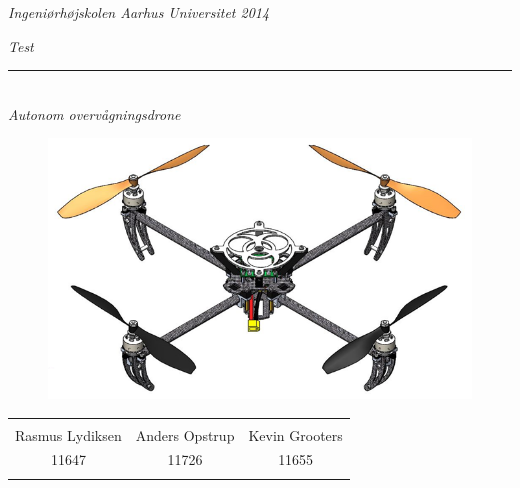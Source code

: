\thispagestyle{empty}

\begin{center}
\textsl{Ingeniørhøjskolen Aarhus Universitet 2014 } \\ \vspace{0.5cm}

\phantom{hul}

\textsl{\HUGE Test } \\ \vspace{0cm}
\rule{15cm}{0.5mm}  \\ \vspace{0.5cm}
\textsl{\LARGE Autonom overvågningsdrone } \\ \vspace{0.5cm}

\vspace{3.5cm}

\begin{figure}[H]
\centering
\includegraphics[width=1\textwidth]{Billeder/Forsidebillede.png}
\label{fig:Forside_foranalyse}
\end{figure}


\vspace{3.5cm}

\begin{table}[H]
	\centering
		\begin{tabular}{c c c}
			\underline{\phantom{mmmmmmmmmmmmmm}} & \underline{\phantom{mmmmmmmmmmmmmm}} & \underline{\phantom{mmmmmmmmmmmmmm}} \\
			Rasmus Lydiksen			& Anders Opstrup 		& Kevin Grooters 			\\
			11647					& 11726					& 11655\\
			&&\\												
		\end{tabular}
\end{table}
\end{center}

